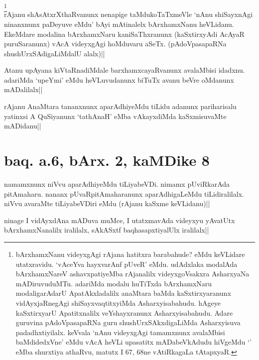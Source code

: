 \begin{artha}
\footnote[3]{bArxhamxNanu videyxgAgi rAjana hatitxra barabahude? eMdu 
keVLidare utatxravidu. `vAceYva hayxvarAnf pUveR' eMdu. udAdxlaka 
modalAda bArxhamxNareV ashavxpatiyeMba rAjanalilx videyxgoVsakxra 
AsharxyaNa mADiruvuduMTu. adariMda modalu huTiTxda bArxhamxNaru 
modaligarAdarU ApatAkxladalilx anaMtara baMda kaSxtirxyaranunx 
vidAyxjaRnegAgi shiSayxvaqtitxyiMda Asharxyisabahudu. hAgeye 
kaSxtirxyarU Apatitxnalilx veYshayxranunx Asharxyisabahudu. Adare 
guruvina pAdoVpasapaRNa guru shushUrxSAkxdigaLiMda Asharxyisuva 
padadhxtiyilalx. keVvala `nAnu videyxgAgi tamamxnunx avalaMbisi 
baMdidedxVne' eMdu vAcA heVLi upasatitx mADabeVkAdudu hiVgeMdu 
`\stext' eMba shurxtiya athaRvu, matutx I 67, 68ne vAtiRkagaLa 
tAtapxyaR.}\\
rAjanu shAsAtxrXthaRvanunx nenapige taMdukoTaTxmeVle `nAnu shiSayxnAgi 
ninanxnunx paDeyuve eMdu' bAyi mAtinalelx bArxhamxNanu heVLidanu. 
EkeMdare modalina bArxhamxNaru kaniSaThxranunx (kaSxtirxyAdi AcAyaR 
puruSaranunx) vAcA videyxgAgi hoMduvaru aSeTx. (pAdoVpasapaRNa 
shushUrxSAdigaLiMdalU alalx)||
\end{artha}

\begin{artha}
Atanu upAyana kiVtaRnadiMdale barxhamxcayaRvanunx avalaMbisi idadxnu. 
adariMda `upeYmi' eMdu heVLuvudanunx biTuTx avanu beVre oMdanunx 
mADalilalx||
\end{artha}

\begin{artha}
rAjanu AnaMtara tananxnunx aparAdhiyeMdu tiLidu adanunx pariharisalu 
yatinxsi A QuSiyanunx `tathAnaH' eMba vAkayxdiMda kaSxmisuvaMte 
mADidanu||
\end{artha}


\section*{baq. a.6, bArx. 2, kaMDike 8}

\stext

\begin{artha}
namamxnunx niVvu aparAdhiyeMdu tiLiyabeVDi. nimamx pUviRkarAda 
pitAmaharu. nananx pUvaRpitAmaharanunx aparAdhigaLeMdu tiLidiralilalx. 
niVvu avaraMte tiLiyabeVDiri eMdu (rAjanu kaSxme keVLidanu)||
\end{artha}

\begin{artha}
ninage I vidAyxdAna mADuva muMce, I utatxmavAda videyxyu yAvatUtx 
bArxhamxNanalilx iralilalx, sAkASxtf baqhasapxtiyalUlx iralilalx||
\end{artha}


